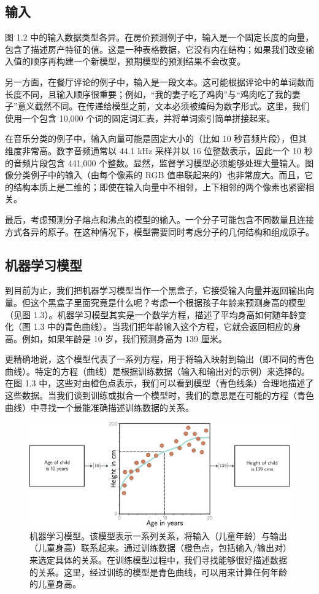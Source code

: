 \subsection{输入}
图 1.2 中的输入数据类型各异。在房价预测例子中，输入是一个固定长度的向量，包含了描述房产特征的值。这是一种表格数据，它没有内在结构；如果我们改变输入值的顺序再构建一个新模型，预期模型的预测结果不会改变。

另一方面，在餐厅评论的例子中，输入是一段文本。这可能根据评论中的单词数而长度不同，且输入顺序很重要；例如，“我的妻子吃了鸡肉”与“鸡肉吃了我的妻子”意义截然不同。在传递给模型之前，文本必须被编码为数字形式。这里，我们使用一个包含 10,000 个词的固定词汇表，并将单词索引简单拼接起来。

在音乐分类的例子中，输入向量可能是固定大小的（比如 10 秒音频片段），但其维度非常高。数字音频通常以 44.1 kHz 采样并以 16 位整数表示，因此一个 10 秒的音频片段包含 441,000 个整数。显然，监督学习模型必须能够处理大量输入。图像分类例子中的输入（由每个像素的 RGB 值串联起来的）也非常庞大。而且，它的结构本质上是二维的；即使在输入向量中不相邻，上下相邻的两个像素也紧密相关。

最后，考虑预测分子熔点和沸点的模型的输入。一个分子可能包含不同数量且连接方式各异的原子。在这种情况下，模型需要同时考虑分子的几何结构和组成原子。
\subsection{机器学习模型}
到目前为止，我们把机器学习模型当作一个黑盒子，它接受输入向量并返回输出向量。但这个黑盒子里面究竟是什么呢？考虑一个根据孩子年龄来预测身高的模型（见图 1.3）。机器学习模型其实是一个数学方程，描述了平均身高如何随年龄变化（图 1.3 中的青色曲线）。当我们把年龄输入这个方程，它就会返回相应的身高。例如，如果年龄是 10 岁，我们预测身高为 139 厘米。

更精确地说，这个模型代表了一系列方程，用于将输入映射到输出（即不同的青色曲线）。特定的方程（曲线）是根据训练数据（输入和输出对的示例）来选择的。在图 1.3 中，这些对由橙色点表示，我们可以看到模型（青色线条）合理地描述了这些数据。当我们谈到训练或拟合一个模型时，我们的意思是在可能的方程（青色曲线）中寻找一个最能准确描述训练数据的关系。

\begin{figure}
	\centering
	\includegraphics[width=0.7\linewidth]{png/chapter1/IntroAgeHeight}
	\caption{机器学习模型。该模型表示一系列关系，将输入（儿童年龄）与输出（儿童身高）联系起来。通过训练数据（橙色点，包括输入/输出对）来选定具体的关系。在训练模型过程中，我们寻找能够很好描述数据的关系。这里，经过训练的模型是青色曲线，可以用来计算任何年龄的儿童身高。}
\end{figure}


